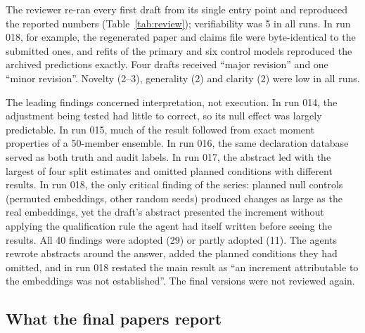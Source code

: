 \documentclass[11pt]{article}
\begin{document}
The reviewer re-ran every first draft from its single entry point and reproduced the reported numbers (Table~\ref{tab:review}); verifiability was 5 in all runs. In run 018, for example, the regenerated paper and claims file were byte-identical to the submitted ones, and refits of the primary and six control models reproduced the archived predictions exactly. Four drafts received ``major revision'' and one ``minor revision''. Novelty (2--3), generality (2) and clarity (2) were low in all runs.

The leading findings concerned interpretation, not execution. In run 014, the adjustment being tested had little to correct, so its null effect was largely predictable. In run 015, much of the result followed from exact moment properties of a 50-member ensemble. In run 016, the same declaration database served as both truth and audit labels. In run 017, the abstract led with the largest of four split estimates and omitted planned conditions with different results. In run 018, the only critical finding of the series: planned null controls (permuted embeddings, other random seeds) produced changes as large as the real embeddings, yet the draft's abstract presented the increment without applying the qualification rule the agent had itself written before seeing the results. All 40 findings were adopted (29) or partly adopted (11). The agents rewrote abstracts around the answer, added the planned conditions they had omitted, and in run 018 restated the main result as ``an increment attributable to the embeddings was not established''. The final versions were not reviewed again.

\subsection{What the final papers report}
\label{sec:res-answers}
\end{document}
